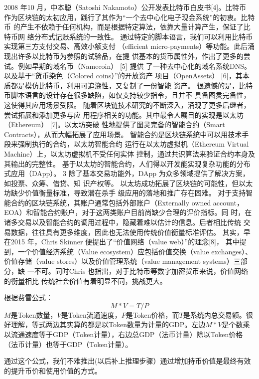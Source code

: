 2008 年10 月，中本聪（Satoshi Nakamoto）公开发表比特币白皮书[4]。比特币
作为区块链的太初应用，践行了其作为“一个去中心化电子现金系统”的初衷。比特币
的产生不依赖于任何机构，而是根据特定算法，依靠大量计算产生，保证了比特币网
络分布式记账系统的一致性。
通过特定的脚本语言，我们可以利用比特币实现第三方支付交易、高效小额支付
（efficient micro-payments）等功能。此后涌现出许多以比特币为参照的试验品，在提
供基本的货币属性外，作出了更多的尝试。例如早期的域名币（Namecoin） [5] 提供
了一种去中心化的域名系统DNS。以及基于“货币染色（Colored coins）”的开放资产
项目（OpenAssets） [6]，其本质都是模仿比特币，利用可追溯性，又复制了一份智能
资产。
很遗憾的是，比特币脚本语言的设计存在很多缺陷，如仅支持较少指令，且并不
具备图灵完备性，这使得其应用场景受限。
随着区块链技术研究的不断深入，涌现了更多后继者，尝试拓展和添加更多与应
用程序相关的功能。其中最令人瞩目的实现是以太坊（Ethereum） [7]。以太坊突破
性地提供了图灵完备的智能合约（Smart Contracts），从而大幅拓展了应用场景。
智能合约是区块链系统中可以用技术手段来强制执行的合约，以太坊智能合约
运行在以太坊虚拟机（Ethereum Virtual Machine）上，以太坊虚拟机不受任何实体
控制，通过共识算法来验证合约本身及其输出的完整性。
基于以太坊的智能合约，人们得以开发能实现复杂功能的分布式应用（DApp）。
3
除了基本交易功能外，DApp 为众多领域提供了解决方案，如投票、众筹、借贷、知
识产权等。
以太坊成功拓展了区块链的可能性，但以太坊缺少价值衡量标准，导致潜在杀手
级应用的落地和推广存在困难。
对于支持智能合约的区块链系统，其账户通常包括外部账户（Externally owned
account，EOA）和智能合约账户，对于这两类账户目前尚缺少合理的评价指标。同
时，在诸多交易以及智能合约的调用过程中，隐藏着难以估计的信息。后者相比传统
交易数据，往往具有更多维度，因此也无法使用传统价值衡量标准评估。
其实，早在2015 年，Chris Skinner 便提出了“价值网络（value web）”的理念[8]，
其中提到，一个价值经济系统（Value ecosystem）应包括价值交换（value exchanges）、
价值存储（value stores）以及价值管理系统（value management systems）三部分，缺
一不可。同时Chris 也指出，对于比特币等数字加密货币来说，价值网络的衡量相比
传统社会价值有着明显不同，挑战更大。

根据费雪公式：
\begin{equation}
M * V = T / P
\end{equation}
\(M\)是Token数量，\(V\)是Token流通速度，\(P\)是Token价格，而\(T\)是系统内总交易额。很好理解，等式两边其实算的都是以Token数量为计量的GDP。左边\(M * V\)是个数乘以流通速度等于GDP（Token计量），右边总GDP（法币计量）除以Token价格（法币计量）也等于GDP（Token计量）。

通过这个公式，我们不难推出(以后补上推理步骤）通过增加持币价值是最终有效的提升币价和使用价值的方式。

